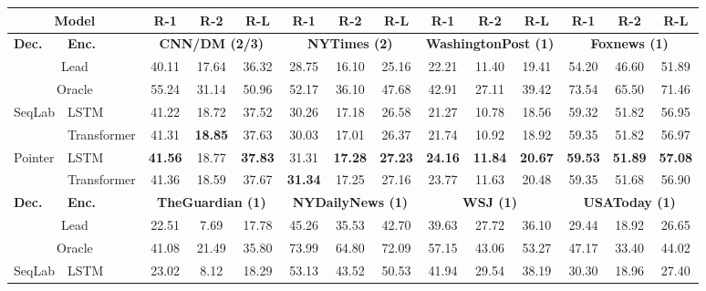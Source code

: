 \documentclass[11pt,a4paper]{article}
\begin{document}
\begin{table*}[t]
\center \footnotesize
{}
\begin{tabular}{llccc|ccc|ccc|ccc}
\toprule
\multicolumn{2}{c}{\textbf{Model}}  &
\textbf{R-1} & \textbf{R-2} & \textbf{R-L} &
\textbf{R-1} & \textbf{R-2} & \textbf{R-L} &
\textbf{R-1} & \textbf{R-2} & \textbf{R-L} &
\textbf{R-1} & \textbf{R-2} & \textbf{R-L} \\
\midrule
\textbf{Dec.} & \textbf{Enc.} &
\multicolumn{3}{c}{\textbf{CNN/DM (2/3)}} &
\multicolumn{3}{c}{\textbf{NYTimes (2)}} &
\multicolumn{3}{c}{\textbf{WashingtonPost (1)}} &
\multicolumn{3}{c}{\textbf{Foxnews (1)}} \\
\cmidrule(lr){1-2} \cmidrule(lr){3-5} \cmidrule(lr){6-8} \cmidrule(lr){9-11} \cmidrule(lr){12-14}
\multicolumn{2}{c}{Lead } & 40.11 & 17.64 & 36.32 & 28.75 & 16.10 & 25.16 & 22.21 & 11.40 & 19.41 & 54.20 & 46.60 & 51.89 \\
\multicolumn{2}{c}{Oracle} & 55.24 & 31.14 & 50.96 & 52.17 & 36.10 & 47.68 & 42.91 & 27.11 & 39.42 & 73.54 & 65.50 & 71.46 \\
\midrule
\multirow{2}{*}{SeqLab}
& LSTM  & 41.22 & 18.72 & 37.52 & 30.26 & 17.18 & 26.58 & 21.27 & 10.78 & 18.56 & 59.32 & 51.82 & 56.95 \\
& Transformer  & 41.31 & \textbf{18.85} & 37.63 & 30.03 & 17.01 & 26.37 & 21.74 & 10.92 & 18.92 & 59.35 & 51.82 & 56.97 \\
\multirow{2}{*}{Pointer}
& LSTM & \textbf{41.56} & 18.77 & \textbf{37.83} & 31.31 & \textbf{17.28} & \textbf{27.23} & \textbf{24.16} & \textbf{11.84} & \textbf{20.67} & \textbf{59.53} & \textbf{51.89} & \textbf{57.08} \\
& Transformer   & 41.36 & 18.59 & 37.67 & \textbf{31.34} & 17.25 & 27.16 & 23.77 & 11.63 & 20.48 & 59.35 & 51.68 & 56.90 \\
\midrule
\textbf{Dec.} & \textbf{Enc.} &
\multicolumn{3}{c}{\textbf{TheGuardian (1)}} &
\multicolumn{3}{c}{\textbf{NYDailyNews (1)}} &
\multicolumn{3}{c}{\textbf{WSJ (1)}} &
\multicolumn{3}{c}{\textbf{USAToday (1)}} \\
\cmidrule(lr){1-2} \cmidrule(lr){3-5} \cmidrule(lr){6-8} \cmidrule(lr){9-11} \cmidrule(lr){12-14}
\multicolumn{2}{c}{Lead} & 22.51 & 7.69 & 17.78 & 45.26 & 35.53 & 42.70 & 39.63 & 27.72 & 36.10 & 29.44 & 18.92 & 26.65 \\
\multicolumn{2}{c}{Oracle} & 41.08 & 21.49 & 35.80 & 73.99 & 64.80 & 72.09 & 57.15 & 43.06 & 53.27 & 47.17 & 33.40 & 44.02 \\
\midrule
\multirow{2}{*}{SeqLab} & LSTM  & 23.02 & 8.12 & 18.29 & 53.13 & 43.52 & 50.53 & 41.94 & 29.54 & 38.19 & 30.30 & 18.96 & 27.40 \\

\end{tabular}
\end{table*}
\end{document}

